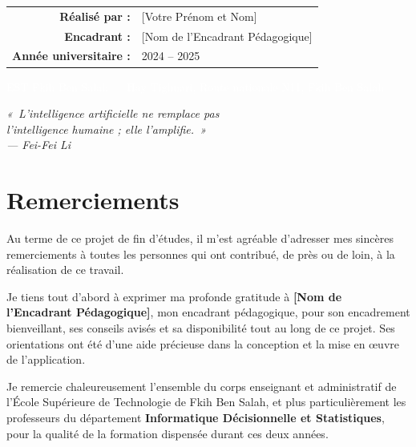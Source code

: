 \documentclass[12pt, a4paper, twoside]{report}
\newcommand{\auteur}{[Votre Prénom et Nom]}
\newcommand{\encadrant}{[Nom de l'Encadrant Pédagogique]}
\newcommand{\annee}{2024 -- 2025}
\begin{document}
\begin{titlepage}
\vspace{1.6cm}
\begin{center}
  \begin{tabular}{rl}
    \textcolor{primary}{\bfseries Réalisé par :}     & \auteur \\[4pt]
    \textcolor{primary}{\bfseries Encadrant :}       & \encadrant \\[4pt]
    \textcolor{primary}{\bfseries Année universitaire :} & \annee \\
  \end{tabular}
\end{center}

\vfill
\begin{center}\textcolor{white}{\small EST Fkih Ben Salah --- Hay Tighnari, Route nationale N11, Fkih Ben Salah}\end{center}
\end{titlepage}

\cleardoublepage
\thispagestyle{empty}
\vspace*{5cm}
\begin{flushright}
\itshape
«~L'intelligence artificielle ne remplace pas\\
l'intelligence humaine ; elle l'amplifie.~»\\[8pt]
\upshape\small --- Fei-Fei Li
\end{flushright}
\cleardoublepage

\chapter*{Remerciements}

Au terme de ce projet de fin d'études, il m'est agréable d'adresser mes sincères remerciements à toutes les personnes qui ont contribué, de près ou de loin, à la réalisation de ce travail.

Je tiens tout d'abord à exprimer ma profonde gratitude à \textbf{\encadrant}, mon encadrant pédagogique, pour son encadrement bienveillant, ses conseils avisés et sa disponibilité tout au long de ce projet. Ses orientations ont été d'une aide précieuse dans la conception et la mise en œuvre de l'application.

Je remercie chaleureusement l'ensemble du corps enseignant et administratif de l'École Supérieure de Technologie de Fkih Ben Salah, et plus particulièrement les professeurs du département \textbf{Informatique Décisionnelle et Statistiques}, pour la qualité de la formation dispensée durant ces deux années.
\end{document}
